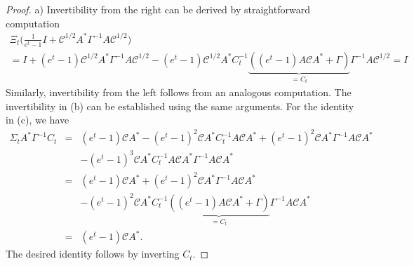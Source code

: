 \documentclass[10pt]{article} %
\theoremstyle{plain}
\theoremstyle{definition}
\theoremstyle{remark}
\newcommand{\C}{\mathcal C}
\begin{document}
\begin{proof}
a) Invertibility from the right can be derived by straightforward computation
    \begin{multline*}
         \Xi_t \bigg( \frac{1}{e^t-1}I + \C^{1/2}A^* \Gamma^{-1}A \C^{1/2}\bigg) \\
         = I + (e^t-1) \C^{1/2}A^* \Gamma^{-1}A \C^{1/2} 
         -  (e^t-1)\C^{1/2} A^* C_t^{-1} \underbrace{\left((e^t-1) A\C A^* + \Gamma \right)}_{= C_t} \Gamma^{-1}A\C^{1/2} = I
    \end{multline*}
Similarly, invertibility from the left follows from an analogous computation. The invertibility in (b) can be established using the same arguments.
For the identity in (c), we have
    \begin{eqnarray*}
        \Sigma_t A^* \Gamma^{-1} C_t 
        & = & (e^t-1)\C A^* -(e^t-1)^2 \C A^*C_t^{-1} A \C A^* + (e^t-1)^2 \C A^* \Gamma^{-1} A \C A^* \\
        & & - (e^t-1)^3 \C A^* C_t^{-1} A \C A^* \Gamma^{-1} A \C A^* \\
        & = & (e^t-1) \C A^* + (e^t-1)^2 \C A^* \Gamma^{-1} A \C A^* \\
        & & - (e^t-1)^2 \C A^* C_t^{-1} \underbrace{\left((e^t-1)A \C A^* + \Gamma \right)}_{=C_t} \Gamma^{-1} A \C A^* \\
        & =& (e^t-1) \C A^*.
    \end{eqnarray*}
The desired identity follows by inverting $C_t$.
\end{proof}
\end{document}
